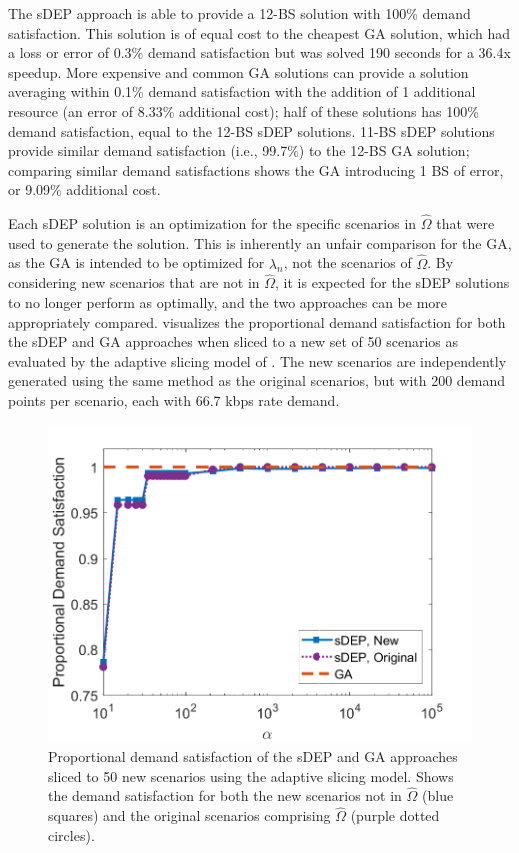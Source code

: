 \documentclass[12pt,dvipsnames]{report}
\begin{document}
The sDEP approach is able to provide a 12-BS solution with 100\% demand satisfaction.  This solution is of equal cost to the cheapest GA solution, which had a loss or error of 0.3\% demand satisfaction but was solved 190 seconds for a 36.4x speedup.  More expensive and common GA solutions can provide a solution averaging within 0.1\% demand satisfaction with the addition of 1 additional resource (an error of 8.33\% additional cost); half of these solutions has 100\% demand satisfaction, equal to the 12-BS sDEP solutions.  11-BS sDEP solutions provide similar demand satisfaction (i.e., 99.7\%) to the 12-BS GA solution; comparing similar demand satisfactions shows the GA introducing 1 BS of error, or 9.09\% additional cost.

Each sDEP solution is an optimization for the specific scenarios in $\hat{\Omega}$ that were used to generate the solution.  This is inherently an unfair comparison for the GA, as the GA is intended to be optimized for $\lambda_n$, not the scenarios of $\hat{\Omega}$.  By considering new scenarios that are not in $\hat{\Omega}$, it is expected for the sDEP solutions to no longer perform as optimally, and the two approaches can be more appropriately compared.   visualizes the proportional demand satisfaction for both the sDEP and GA approaches when sliced to a new set of 50 scenarios as evaluated by the adaptive slicing model of .  The new scenarios are independently generated using the same method as the original scenarios, but with 200 demand points per scenario, each with 66.7 kbps rate demand.

\begin{figure}[htp]
	\centering
	\includegraphics[height=0.4\textheight]{Figures/Prelim_EvalO25_ComparisonSatisfactionFull}
	\caption[Demand satisfaction of the preliminary simulations evaluated against 50 new scenarios]{Proportional demand satisfaction of the sDEP and GA approaches sliced to 50 new scenarios using the adaptive slicing model. Shows the demand satisfaction for both the new scenarios not in $\hat{\Omega}$ (blue squares) and the original scenarios comprising $\hat{\Omega}$ (purple dotted circles).}
	\label{fig:Prelim_VWNCompSatisEval}
\end{figure}
\end{document}
